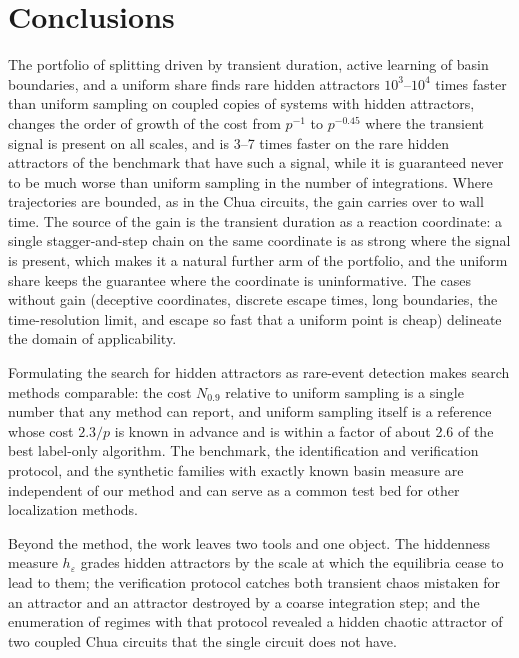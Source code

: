 \section{Conclusions}\label{sec:conclusion}

The portfolio of splitting driven by transient duration, active learning of basin boundaries, and a uniform share finds rare hidden attractors $10^3$--$10^4$ times faster than uniform sampling on coupled copies of systems with hidden attractors, changes the order of growth of the cost from $p^{-1}$ to $p^{-0.45}$ where the transient signal is present on all scales, and is 3--7 times faster on the rare hidden attractors of the benchmark that have such a signal, while it is guaranteed never to be much worse than uniform sampling in the number of integrations. Where trajectories are bounded, as in the Chua circuits, the gain carries over to wall time. The source of the gain is the transient duration as a reaction coordinate: a single stagger-and-step chain on the same coordinate is as strong where the signal is present, which makes it a natural further arm of the portfolio, and the uniform share keeps the guarantee where the coordinate is uninformative. The cases without gain (deceptive coordinates, discrete escape times, long boundaries, the time-resolution limit, and escape so fast that a uniform point is cheap) delineate the domain of applicability.

Formulating the search for hidden attractors as rare-event detection makes search methods comparable: the cost $N_{0.9}$ relative to uniform sampling is a single number that any method can report, and uniform sampling itself is a reference whose cost $2.3/p$ is known in advance and is within a factor of about 2.6 of the best label-only algorithm. The benchmark, the identification and verification protocol, and the synthetic families with exactly known basin measure are independent of our method and can serve as a common test bed for other localization methods.

Beyond the method, the work leaves two tools and one object. The hiddenness measure $h_\varepsilon$ grades hidden attractors by the scale at which the equilibria cease to lead to them; the verification protocol catches both transient chaos mistaken for an attractor and an attractor destroyed by a coarse integration step; and the enumeration of regimes with that protocol revealed a hidden chaotic attractor of two coupled Chua circuits that the single circuit does not have.
